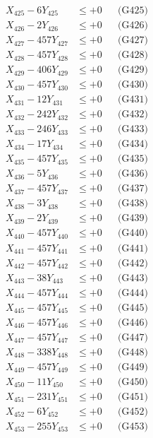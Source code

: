 \documentclass[a4paper,10pt]{article}
\begin{document}
{\begin{align}
X_{425} - 6Y_{425} &\leq +0 && \text{(G425)} \\
X_{426} - 2Y_{426} &\leq +0 && \text{(G426)} \\
X_{427} - 457Y_{427} &\leq +0 && \text{(G427)} \\
X_{428} - 457Y_{428} &\leq +0 && \text{(G428)} \\
X_{429} - 406Y_{429} &\leq +0 && \text{(G429)} \\
X_{430} - 457Y_{430} &\leq +0 && \text{(G430)} \\
\allowbreak
X_{431} - 12Y_{431} &\leq +0 && \text{(G431)} \\
X_{432} - 242Y_{432} &\leq +0 && \text{(G432)} \\
X_{433} - 246Y_{433} &\leq +0 && \text{(G433)} \\
X_{434} - 17Y_{434} &\leq +0 && \text{(G434)} \\
X_{435} - 457Y_{435} &\leq +0 && \text{(G435)} \\
X_{436} - 5Y_{436} &\leq +0 && \text{(G436)} \\
X_{437} - 457Y_{437} &\leq +0 && \text{(G437)} \\
X_{438} - 3Y_{438} &\leq +0 && \text{(G438)} \\
X_{439} - 2Y_{439} &\leq +0 && \text{(G439)} \\
X_{440} - 457Y_{440} &\leq +0 && \text{(G440)} \\
\allowbreak
X_{441} - 457Y_{441} &\leq +0 && \text{(G441)} \\
X_{442} - 457Y_{442} &\leq +0 && \text{(G442)} \\
X_{443} - 38Y_{443} &\leq +0 && \text{(G443)} \\
X_{444} - 457Y_{444} &\leq +0 && \text{(G444)} \\
X_{445} - 457Y_{445} &\leq +0 && \text{(G445)} \\
X_{446} - 457Y_{446} &\leq +0 && \text{(G446)} \\
X_{447} - 457Y_{447} &\leq +0 && \text{(G447)} \\
X_{448} - 338Y_{448} &\leq +0 && \text{(G448)} \\
X_{449} - 457Y_{449} &\leq +0 && \text{(G449)} \\
X_{450} - 11Y_{450} &\leq +0 && \text{(G450)} \\
\allowbreak
X_{451} - 231Y_{451} &\leq +0 && \text{(G451)} \\
X_{452} - 6Y_{452} &\leq +0 && \text{(G452)} \\
X_{453} - 255Y_{453} &\leq +0 && \text{(G453)} \\

\end{align}}
\end{document}
